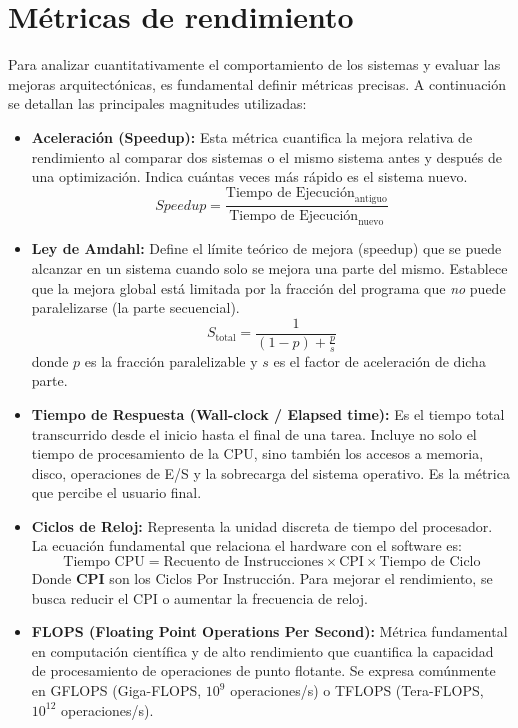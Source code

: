 \documentclass[11pt,a4paper]{article}
\begin{document}
\section{Métricas de rendimiento}

Para analizar cuantitativamente el comportamiento de los sistemas y evaluar las mejoras arquitectónicas, es fundamental definir métricas precisas. A continuación se detallan las principales magnitudes utilizadas:

\begin{itemize}
    \item \textbf{Aceleración (Speedup):} 
    Esta métrica cuantifica la mejora relativa de rendimiento al comparar dos sistemas o el mismo sistema antes y después de una optimización. Indica cuántas veces más rápido es el sistema nuevo.
    \[ 
        Speedup = \frac{\text{Tiempo de Ejecución}_{\text{antiguo}}}{\text{Tiempo de Ejecución}_{\text{nuevo}}} 
    \]

    \item \textbf{Ley de Amdahl:} 
    Define el límite teórico de mejora (speedup) que se puede alcanzar en un sistema cuando solo se mejora una parte del mismo. Establece que la mejora global está limitada por la fracción del programa que \textit{no} puede paralelizarse (la parte secuencial).
    \[
        S_{\text{total}} = \frac{1}{(1-p) + \frac{p}{s}}
    \]
    \noindent donde $p$ es la fracción paralelizable y $s$ es el factor de aceleración de dicha parte.

    \item \textbf{Tiempo de Respuesta (Wall-clock / Elapsed time):} 
    Es el tiempo total transcurrido desde el inicio hasta el final de una tarea. Incluye no solo el tiempo de procesamiento de la CPU, sino también los accesos a memoria, disco, operaciones de E/S y la sobrecarga del sistema operativo. Es la métrica que percibe el usuario final.

    \item \textbf{Ciclos de Reloj:} 
    Representa la unidad discreta de tiempo del procesador. La ecuación fundamental que relaciona el hardware con el software es:
    \[ 
        \text{Tiempo CPU} = \text{Recuento de Instrucciones} \times \text{CPI} \times \text{Tiempo de Ciclo} 
    \]
    \noindent Donde \textbf{CPI} son los Ciclos Por Instrucción. Para mejorar el rendimiento, se busca reducir el CPI o aumentar la frecuencia de reloj.

    \item \textbf{FLOPS (Floating Point Operations Per Second):} 
    Métrica fundamental en computación científica y de alto rendimiento que cuantifica la capacidad de procesamiento de operaciones de punto flotante. Se expresa comúnmente en GFLOPS (Giga-FLOPS, $10^9$ operaciones/s) o TFLOPS (Tera-FLOPS, $10^{12}$ operaciones/s).
    

\end{itemize}
\end{document}
